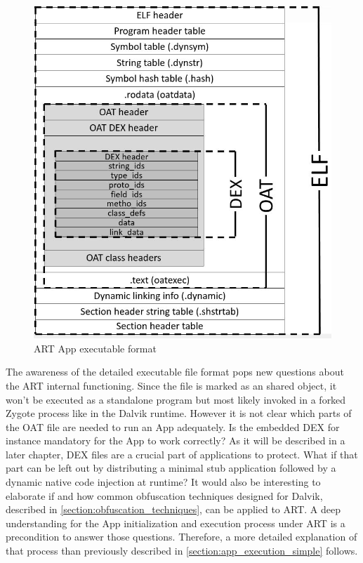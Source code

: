 \begin{figure}[htb]
  \centering
  \includegraphics[scale=0.6]{figures/andelf_format}
  \caption[ART App executable format]{ART App executable format}
  \label{fig:andelf_format}
\end{figure}

The awareness of the detailed executable file format pops
new questions about the ART internal functioning.
Since the file is marked as an shared object, it won't be
executed as a standalone program but most likely
invoked in a forked Zygote process like in the Dalvik runtime.
However it is not clear which parts of the OAT file are
needed to run an App adequately. Is the embedded DEX for instance
mandatory for the App to work correctly? As it will be described
in a later chapter, DEX files are
a crucial part of applications to protect. What if that part
can be left out by distributing a minimal stub application
followed by a dynamic native code injection at runtime?
It would also be interesting to elaborate if and how common obfuscation
techniques designed for Dalvik, described in \autoref{section:obfuscation_techniques}, can be applied to ART.
A deep understanding for the App initialization and execution
process under ART is a precondition to answer those
questions. Therefore, a more detailed explanation of that process
than previously described in
\autoref{section:app_execution_simple} follows.
